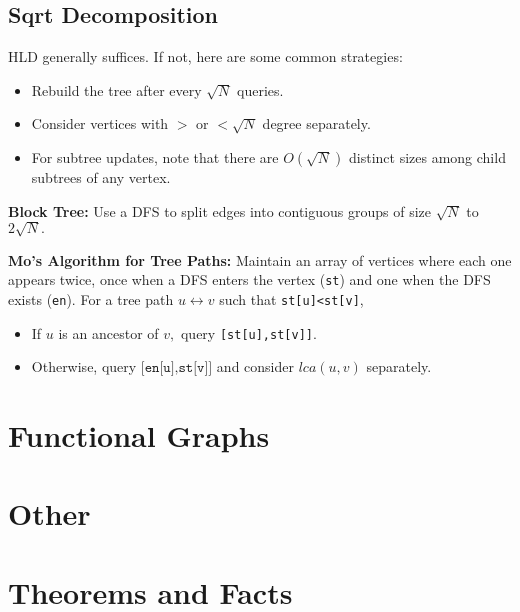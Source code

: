     \subsection{Sqrt Decomposition}
		HLD generally suffices. If not, here are some common strategies:
		\begin{itemize}
			\item Rebuild the tree after every $\sqrt N$ queries. 
			\item Consider vertices with $>$ or $<\sqrt N$ degree separately. 
			\item For subtree updates, note that there are $O(\sqrt N)$ distinct sizes among child subtrees of any vertex.
		\end{itemize}

		\textbf{Block Tree:} Use a DFS to split edges into contiguous groups of size $\sqrt N$ to $2\sqrt N.$

		\textbf{Mo's Algorithm for Tree Paths:} Maintain an array of vertices where each one appears twice, once when a DFS enters the vertex (\texttt{st}) and one when the DFS exists (\texttt{en}). For a tree path $u\leftrightarrow v$ such that \texttt{st[u]<st[v]},

		\begin{itemize}
		\item If $u$ is an ancestor of $v,$ query \texttt{[st[u],st[v]]}.
		\item Otherwise, query $\texttt{[en[u],st[v]]}$ and consider $lca(u,v)$ separately.
		\end{itemize}
    
\section{Functional Graphs}


\section{Other}

\section{Theorems and Facts}
